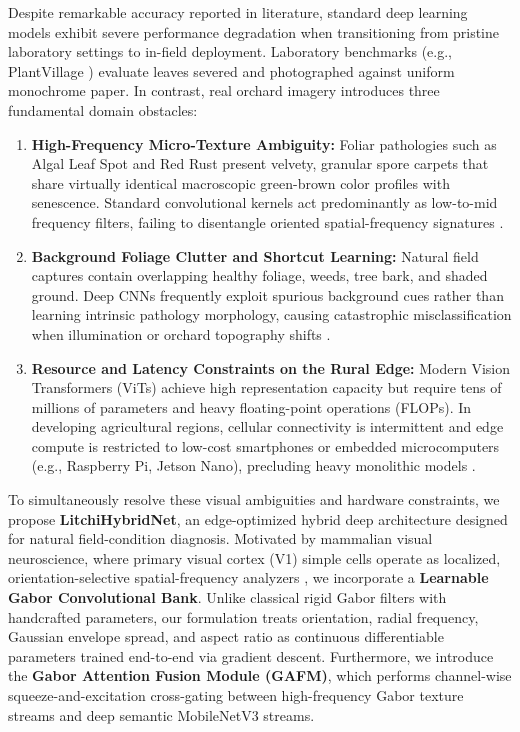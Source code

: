 \documentclass[journal]{IEEEtran}
\begin{document}
Despite remarkable accuracy reported in literature, standard deep learning models exhibit severe performance degradation when transitioning from pristine laboratory settings to in-field deployment. Laboratory benchmarks (e.g., PlantVillage \cite{hughes2015open}) evaluate leaves severed and photographed against uniform monochrome paper. In contrast, real orchard imagery introduces three fundamental domain obstacles:
\begin{enumerate}
    \item \textbf{High-Frequency Micro-Texture Ambiguity:} Foliar pathologies such as Algal Leaf Spot and Red Rust present velvety, granular spore carpets that share virtually identical macroscopic green-brown color profiles with senescence. Standard convolutional kernels act predominantly as low-to-mid frequency filters, failing to disentangle oriented spatial-frequency signatures \cite{wang2021gabor}.
    \item \textbf{Background Foliage Clutter and Shortcut Learning:} Natural field captures contain overlapping healthy foliage, weeds, tree bark, and shaded ground. Deep CNNs frequently exploit spurious background cues rather than learning intrinsic pathology morphology, causing catastrophic misclassification when illumination or orchard topography shifts \cite{singh2020deep}.
    \item \textbf{Resource and Latency Constraints on the Rural Edge:} Modern Vision Transformers (ViTs) \cite{dosovitskiy2020image, liu2021swin} achieve high representation capacity but require tens of millions of parameters and heavy floating-point operations (FLOPs). In developing agricultural regions, cellular connectivity is intermittent and edge compute is restricted to low-cost smartphones or embedded microcomputers (e.g., Raspberry Pi, Jetson Nano), precluding heavy monolithic models \cite{ahmed2022field}.
\end{enumerate}

To simultaneously resolve these visual ambiguities and hardware constraints, we propose \textbf{LitchiHybridNet}, an edge-optimized hybrid deep architecture designed for natural field-condition diagnosis. Motivated by mammalian visual neuroscience, where primary visual cortex (V1) simple cells operate as localized, orientation-selective spatial-frequency analyzers \cite{daugman1985uncertainty}, we incorporate a \textbf{Learnable Gabor Convolutional Bank}. Unlike classical rigid Gabor filters with handcrafted parameters, our formulation treats orientation, radial frequency, Gaussian envelope spread, and aspect ratio as continuous differentiable parameters trained end-to-end via gradient descent. Furthermore, we introduce the \textbf{Gabor Attention Fusion Module (GAFM)}, which performs channel-wise squeeze-and-excitation cross-gating between high-frequency Gabor texture streams and deep semantic MobileNetV3 streams.
\end{document}
